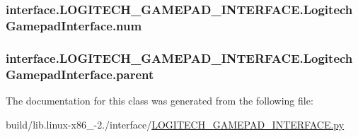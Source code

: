 \subsubsection[{num}]{\setlength{\rightskip}{0pt plus 5cm}interface.\+L\+O\+G\+I\+T\+E\+C\+H\+\_\+\+G\+A\+M\+E\+P\+A\+D\+\_\+\+I\+N\+T\+E\+R\+F\+A\+C\+E.\+Logitech\+Gamepad\+Interface.\+num}\label{classinterface_1_1LOGITECH__GAMEPAD__INTERFACE_1_1LogitechGamepadInterface_afe919de9303d9c9c6f60e8b8db0755dd}
\hypertarget{classinterface_1_1LOGITECH__GAMEPAD__INTERFACE_1_1LogitechGamepadInterface_a1ef8059ab625cac977f6a17662f5c0d9}{}
\subsubsection[{parent}]{\setlength{\rightskip}{0pt plus 5cm}interface.\+L\+O\+G\+I\+T\+E\+C\+H\+\_\+\+G\+A\+M\+E\+P\+A\+D\+\_\+\+I\+N\+T\+E\+R\+F\+A\+C\+E.\+Logitech\+Gamepad\+Interface.\+parent}\label{classinterface_1_1LOGITECH__GAMEPAD__INTERFACE_1_1LogitechGamepadInterface_a1ef8059ab625cac977f6a17662f5c0d9}


The documentation for this class was generated from the following file\+:\begin{DoxyCompactItemize}
\item 
build/lib.\+linux-\/x86\+\_-\/2./interface/\hyperlink{build_2lib_8linux-x86__64-2_87_2interface_2LOGITECH__GAMEPAD__INTERFACE_8py}{L\+O\+G\+I\+T\+E\+C\+H\+\_\+\+G\+A\+M\+E\+P\+A\+D\+\_\+\+I\+N\+T\+E\+R\+F\+A\+C\+E.\+py}\end{DoxyCompactItemize}
